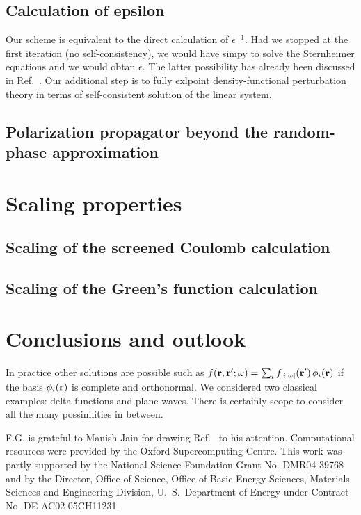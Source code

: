 \documentclass[twocolumn,prb,showpacs,superscriptaddress]{revtex4}
\def\w{\omega}
\def\r{{\bf r}}
\def\rp{{\bf r^\prime}}
\begin{document}
\subsection{Calculation of epsilon}

Our scheme is equivalent to the direct calculation of $\epsilon^{-1}$.
Had we stopped at the first iteration (no self-consistency), we would have
simpy to solve the Sternheimer equations and we would obtan $\epsilon$.
The latter possibility has already been discussed in Ref.\ .
Our additional step is to fully exlpoint density-functional perturbation theory
in terms of self-consistent solution of the linear system.

\subsection{Polarization propagator beyond the random-phase approximation}\label{sec.beyond_rpa}

\section{Scaling properties}

\subsection{Scaling of the screened Coulomb calculation}\label{sec.coulomb.scaling}
\subsection{Scaling of the Green's function calculation}\label{sec.green.scaling}

\section{Conclusions and outlook}

In practice other solutions are possible such as $f(\r,\rp;\w) = \sum_i f_{[i,\w]}(\rp) \, \phi_i(\r)$
if the basis $\phi_i(\r)$ is complete and orthonormal. We considered two classical
examples: delta functions and plane waves. There is certainly scope to consider
all the many possinilities in between.

\begin{acknowledgments}
F.G. is grateful to Manish Jain for drawing Ref.\  to his attention.
Computational resources were provided by the Oxford Supercomputing Centre.
This work was partly supported by the National Science Foundation Grant No. DMR04-39768 and by
the Director, Office of Science, Office of Basic Energy Sciences, Materials Sciences
and Engineering Division, U.\ S.\ Department of Energy under Contract No. DE-AC02-05CH11231.
\end{acknowledgments}
\end{document}
